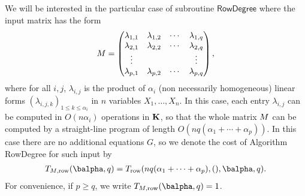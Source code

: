 \documentclass[12pt]{article}
\begin{document}
We will be interested in the particular case of subroutine
$\mathsf{RowDegree}$ where the input matrix has the form
\begin{align}\label{eqdef:type2aff}
  {M}= \left( \begin{matrix}
    \lambda_{1,1} & \lambda_{1,2} & \cdots & \lambda_{1, q}\\
    \lambda_{2,1} &  \lambda_{2,2} & \cdots & \lambda_{2, q}\\
    \vdots & & & \vdots\\
    \lambda_{p,1} &  \lambda_{p,2}& \cdots & \lambda_{p, q}
  \end{matrix} \right),
\end{align}
where for all $i,j$, $\lambda_{i,j}$ is the product of $\alpha_i$ (non
necessarily homogeneous) linear forms $(\lambda_{i,j,k})_{1 \le k \le
  \alpha_i}$ in $n$ variables $X_1,\dots,X_n$. In this case, each
entry $\lambda_{i,j}$ can be computed in $O(n \alpha_i)$ operations in
$\mathbf{K}$, so that the whole matrix ${M}$ can be computed by a
straight-line program of length $O(nq(\alpha_1+\cdots+\alpha_p))$. In
this case there are no additional equations $G$, so we denote the cost
of Algorithm {\sf RowDegree} for such input by
\begin{align}
T_{M,{\rm row}}(\balpha,q)=T_{\rm row}(nq(\alpha_1+\cdots+\alpha_p),(),\balpha,q).
\end{align}
For convenience, if $p \ge q$,
we write $T_{M,{\rm row}}(\balpha,q)=1$.
\end{document}
